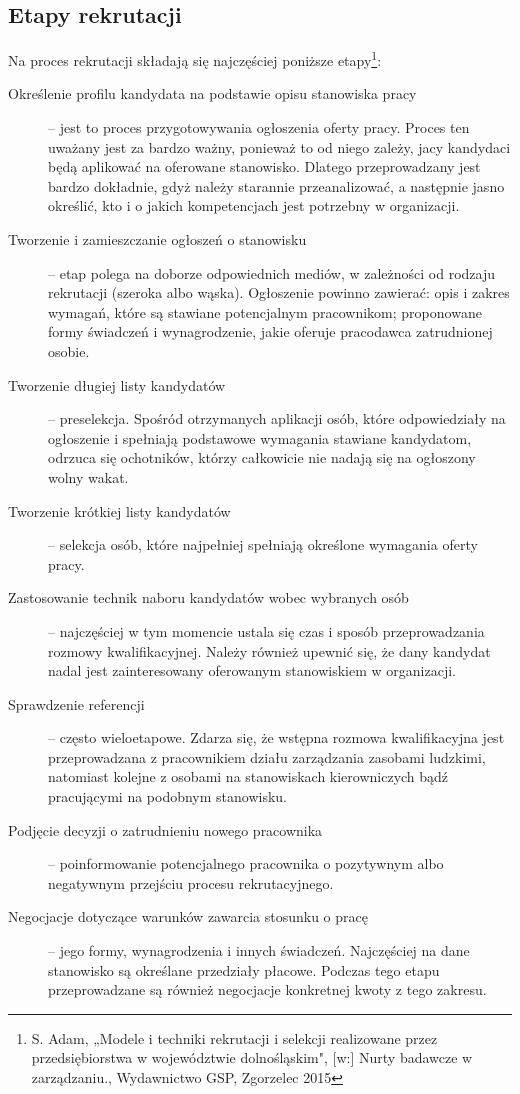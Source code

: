 \documentclass[twoside]{projektInzynierskiMS}
\numberwithin{figure}{section}
\begin{document}
\subsection{Etapy rekrutacji}
Na proces rekrutacji składają się najczęściej poniższe etapy\footnote{S. Adam, „Modele i techniki rekrutacji i selekcji realizowane przez przedsiębiorstwa w województwie dolnośląskim", [w:] Nurty badawcze w zarządzaniu., Wydawnictwo GSP, Zgorzelec 2015}: 

\begin{description}
\item[Określenie profilu kandydata na podstawie opisu stanowiska pracy] – jest to proces przygotowywania ogłoszenia oferty pracy. Proces ten uważany jest za bardzo ważny, ponieważ to od niego zależy, jacy kandydaci będą aplikować na oferowane stanowisko. Dlatego przeprowadzany jest bardzo dokładnie, gdyż należy starannie przeanalizować, a następnie jasno określić, kto i o jakich kompetencjach jest potrzebny w organizacji.
\item[Tworzenie i zamieszczanie ogłoszeń o stanowisku] – etap polega na doborze odpowiednich mediów, w zależności od rodzaju rekrutacji (szeroka albo wąska). Ogłoszenie powinno zawierać: opis i zakres wymagań, które są stawiane potencjalnym pracownikom; proponowane formy świadczeń i wynagrodzenie, jakie oferuje pracodawca zatrudnionej osobie.
\item[Tworzenie długiej listy kandydatów] – preselekcja. Spośród otrzymanych aplikacji osób, które odpowiedziały na ogłoszenie i spełniają podstawowe wymagania stawiane kandydatom, odrzuca się ochotników, którzy całkowicie nie nadają się na ogłoszony wolny wakat.
\item[Tworzenie krótkiej listy kandydatów] – selekcja osób, które najpełniej spełniają określone wymagania oferty pracy.
\item[Zastosowanie technik naboru kandydatów wobec wybranych osób] – najczęściej w tym momencie ustala się czas i sposób przeprowadzania rozmowy kwalifikacyjnej. Należy również upewnić się, że dany kandydat nadal jest zainteresowany oferowanym stanowiskiem w organizacji.
\item[Sprawdzenie referencji] – często wieloetapowe. Zdarza się, że wstępna rozmowa kwalifikacyjna jest przeprowadzana z pracownikiem działu zarządzania zasobami ludzkimi, natomiast kolejne z osobami na stanowiskach kierowniczych bądź pracującymi na podobnym stanowisku.
\item[Podjęcie decyzji o zatrudnieniu nowego pracownika] – poinformowanie potencjalnego pracownika o pozytywnym albo negatywnym przejściu procesu rekrutacyjnego.
\item[Negocjacje dotyczące warunków zawarcia stosunku o pracę] – jego formy, wynagrodzenia i innych świadczeń. Najczęściej na dane stanowisko są określane przedziały płacowe. Podczas tego etapu przeprowadzane są również negocjacje konkretnej kwoty z tego zakresu.
\end{description}
\end{document}
